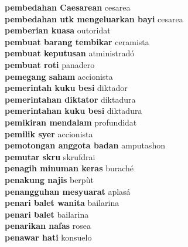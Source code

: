 \textbf{ pembedahan Caesarean  } cesarea \\
\textbf{ pembedahan utk mengeluarkan bayi  } cesarea \\
\textbf{ pemberian kuasa  } outoridat \\
\textbf{ pembuat barang tembikar  } ceramista \\
\textbf{ pembuat keputusan  } atministradó \\
\textbf{ pembuat roti  } panadero \\
\textbf{ pemegang saham  } accionista \\
\textbf{ pemerintah kuku besi  } diktador \\
\textbf{ pemerintahan diktator  } diktadura \\
\textbf{ pemerintahan kuku besi  } diktadura \\
\textbf{ pemikiran mendalam  } profundidat \\
\textbf{ pemilik syer  } accionista \\
\textbf{ pemotongan anggota badan  } amputashon \\
\textbf{ pemutar skru  } skrufdrai \\
\textbf{ penagih minuman keras  } buraché \\
\textbf{ penakung najis  } berpùt \\
\textbf{ penangguhan mesyuarat  } aplasá \\
\textbf{ penari balet wanita  } bailarina \\
\textbf{ penari balet  } bailarina \\
\textbf{ penarikan nafas  } rosea \\
\textbf{ penawar hati  } konsuelo \\
